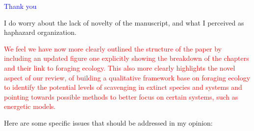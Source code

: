 \documentclass[12pt,letterpaper]{article}
\begin{document}
\textcolor{blue}{Thank you}

I do worry about the lack of novelty of the manuscript, and what I perceived as haphazard organization. 

\textcolor{red}{We feel we have now more clearly outlined the structure of the paper by including an updated figure one explicitly showing the breakdown of the chapters and their link to foraging ecology. This also more clearly highlights the novel aspect of our review, of building a qualitative framework base on foraging ecology to identify the potential levels of scavenging in extinct species and systems and pointing towards possible methods to better focus on certain systems, such as energetic models.}

Here are some specific issues that should be addressed in my opinion:
\end{document}
